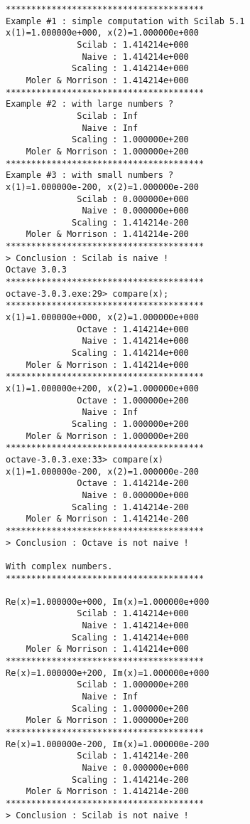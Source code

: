 \begin{lstlisting}
***************************************
Example #1 : simple computation with Scilab 5.1
x(1)=1.000000e+000, x(2)=1.000000e+000
              Scilab : 1.414214e+000
               Naive : 1.414214e+000
             Scaling : 1.414214e+000
    Moler & Morrison : 1.414214e+000
***************************************
Example #2 : with large numbers ?
              Scilab : Inf
               Naive : Inf
             Scaling : 1.000000e+200
    Moler & Morrison : 1.000000e+200
***************************************
Example #3 : with small numbers ?
x(1)=1.000000e-200, x(2)=1.000000e-200
              Scilab : 0.000000e+000
               Naive : 0.000000e+000
             Scaling : 1.414214e-200
    Moler & Morrison : 1.414214e-200
***************************************
> Conclusion : Scilab is naive !
Octave 3.0.3
***************************************
octave-3.0.3.exe:29> compare(x);
***************************************
x(1)=1.000000e+000, x(2)=1.000000e+000
              Octave : 1.414214e+000
               Naive : 1.414214e+000
             Scaling : 1.414214e+000
    Moler & Morrison : 1.414214e+000
***************************************
x(1)=1.000000e+200, x(2)=1.000000e+000
              Octave : 1.000000e+200
               Naive : Inf
             Scaling : 1.000000e+200
    Moler & Morrison : 1.000000e+200
***************************************
octave-3.0.3.exe:33> compare(x)
x(1)=1.000000e-200, x(2)=1.000000e-200
              Octave : 1.414214e-200
               Naive : 0.000000e+000
             Scaling : 1.414214e-200
    Moler & Morrison : 1.414214e-200
***************************************
> Conclusion : Octave is not naive !

With complex numbers.
***************************************

Re(x)=1.000000e+000, Im(x)=1.000000e+000
              Scilab : 1.414214e+000
               Naive : 1.414214e+000
             Scaling : 1.414214e+000
    Moler & Morrison : 1.414214e+000
***************************************
Re(x)=1.000000e+200, Im(x)=1.000000e+000
              Scilab : 1.000000e+200
               Naive : Inf
             Scaling : 1.000000e+200
    Moler & Morrison : 1.000000e+200
***************************************
Re(x)=1.000000e-200, Im(x)=1.000000e-200
              Scilab : 1.414214e-200
               Naive : 0.000000e+000
             Scaling : 1.414214e-200
    Moler & Morrison : 1.414214e-200
***************************************
> Conclusion : Scilab is not naive !
\end{lstlisting}


